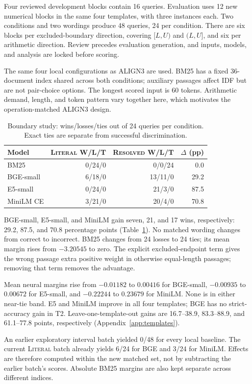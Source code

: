 \documentclass[conference,letterpaper]{IEEEtran}
\newcommand{\lit}{\textsc{Literal}}
\newcommand{\res}{\textsc{Resolved}}
\begin{document}
Four reviewed development blocks contain 16 queries. Evaluation uses 12 new numerical blocks in the same four templates, with three instances each. Two conditions and two wordings produce 48 queries, 24 per condition. There are six blocks per excluded-boundary direction, covering $[L,U)$ and $(L,U]$, and six per arithmetic direction. Review precedes evaluation generation, and inputs, models, and analysis are locked before scoring.

The same four local configurations as ALIGN3 are used. BM25 has a fixed 36-document index shared across both conditions; auxiliary passages affect IDF but are not pair-choice options. The longest scored input is 60 tokens. Arithmetic demand, length, and token pattern vary together here, which motivates the operation-matched ALIGN3 design.
\begin{table}[t]
\caption{Boundary study: wins/losses/ties out of 24 queries per condition. Exact ties are separate from successful discrimination.}
\label{tab:boundary}
\centering\footnotesize
\begin{tabular}{lrrr}
\toprule
Model & \lit{} W/L/T & \res{} W/L/T & $\Delta$ (pp) \\
\midrule
BM25 & 0/24/0 & 0/0/24 & 0.0 \\
BGE-small & 6/18/0 & 13/11/0 & 29.2 \\
E5-small & 0/24/0 & 21/3/0 & 87.5 \\
MiniLM CE & 3/21/0 & 20/4/0 & 70.8 \\
\bottomrule
\end{tabular}
\end{table}
BGE-small, E5-small, and MiniLM gain seven, 21, and 17 wins, respectively: 29.2, 87.5, and 70.8 percentage points (Table~\ref{tab:boundary}). No matched wording changes from correct to incorrect. BM25 changes from 24 losses to 24 ties; its mean margin rises from $-3.20545$ to zero. The explicit excluded-endpoint term gives the wrong passage extra positive weight in otherwise equal-length passages; removing that term removes the advantage.

Mean neural margins rise from $-0.01182$ to $0.00416$ for BGE-small, $-0.00935$ to $0.00672$ for E5-small, and $-0.22244$ to $0.23679$ for MiniLM. None is in either near-tie band. E5 and MiniLM improve in all four templates; BGE has no strict-accuracy gain in T2. Leave-one-template-out gains are 16.7--38.9, 83.3--88.9, and 61.1--77.8 points, respectively (Appendix~\ref{app:templates}).

An earlier exploratory interval batch yielded 0/48 for every local baseline. The current \lit{} batch already yields 6/24 for BGE and 3/24 for MiniLM. Effects are therefore computed within the new matched set, not by subtracting the earlier batch's scores. Absolute BM25 margins are also kept separate across different indices.
\end{document}
